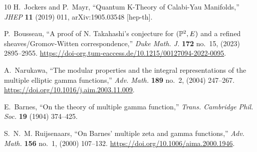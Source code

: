 \documentclass[a4paper,12pt,justification=centering]{article}
\numberwithin{equation}{section}
\providecommand{\href}[2]{#2}
\theoremstyle{plain}%
\theoremstyle{definition}
\begin{document}
\begin{thebibliography}{10}
H.~Jockers and P.~Mayr, ``{Quantum K-Theory of Calabi-Yau Manifolds},''
  \href{http://dx.doi.org/10.1007/JHEP11(2019)011}{{\em JHEP} {\bfseries 11}
  (2019) 011}, \href{http://arxiv.org/abs/1905.03548}{{\ttfamily
  arXiv:1905.03548 [hep-th]}}.

P.~Bousseau, ``A proof of {N}. {T}akahashi's conjecture for {$(\Bbb P^2,E)$}
  and a refined sheaves/{G}romov-{W}itten correspondence,''
  \href{http://dx.doi.org/10.1215/00127094-2022-0095}{{\em Duke Math. J.}
  {\bfseries 172} no.~15, (2023) 2895--2955}.
  \url{https://doi-org.tum-eaccess.de/10.1215/00127094-2022-0095}.

A.~Narukawa, ``The modular properties and the integral representations of the
  multiple elliptic gamma functions,''
  \href{http://dx.doi.org/10.1016/j.aim.2003.11.009}{{\em Adv. Math.}
  {\bfseries 189} no.~2, (2004) 247--267}.
  \url{https://doi.org/10.1016/j.aim.2003.11.009}.

E.~Barnes, ``On the theory of multiple gamma function,'' {\em Trans. Cambridge
  Phil. Soc.} {\bfseries 19} (1904) 374--425.

S.~N.~M. Ruijsenaars, ``On {B}arnes' multiple zeta and gamma functions,''
  \href{http://dx.doi.org/10.1006/aima.2000.1946}{{\em Adv. Math.} {\bfseries
  156} no.~1, (2000) 107--132}. \url{https://doi.org/10.1006/aima.2000.1946}.

\end{thebibliography}\endgroup
\end{document}
